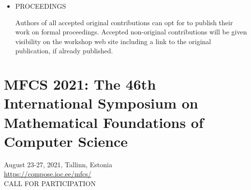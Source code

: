 \documentclass[prodmode,acmtecs]{acmsmall} %
\begin{document}
\begin{itemize}
\item  PROCEEDINGS 
 
  Authors of all accepted original contributions can opt for to publish their work on formal proceedings.  Accepted non-original contributions will be given visibility on the workshop web site including a link to the original publication, if already published. 
 
\end{itemize}\section{MFCS 2021: The 46th International Symposium on Mathematical Foundations of Computer Science}\label{MFCS2021}  August 23-27, 2021, Tallinn, Estonia\\ 
  \href{https://compose.ioc.ee/mfcs/}{https://compose.ioc.ee/mfcs/}\\ 
CALL FOR PARTICIPATION 
\end{document}
